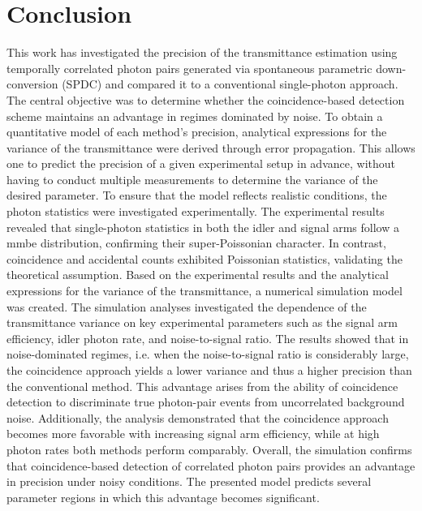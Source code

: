 \section{Conclusion}
This work has investigated the precision of the transmittance estimation using temporally correlated photon pairs generated via spontaneous parametric down-conversion (SPDC) and compared it to a conventional single-photon approach. The central objective was to determine whether the coincidence-based detection scheme maintains an advantage in regimes dominated by noise. \newline
To obtain a quantitative model of each method’s precision, analytical expressions for the variance of the transmittance were derived through error propagation. This allows one to predict the precision of a given experimental setup in advance, without having to conduct multiple measurements to determine the variance of the desired parameter. To ensure that the model reflects realistic conditions, the photon statistics were investigated experimentally. \newline
The experimental results revealed that single-photon statistics in both the idler and signal arms follow a \acrshort{mmbe} distribution, confirming their super-Poissonian character. In contrast, coincidence and accidental counts exhibited Poissonian statistics, validating the theoretical assumption. Based on the experimental results and the analytical expressions for the variance of the transmittance, a numerical simulation model was created. \newline
The simulation analyses investigated the dependence of the transmittance variance on key experimental parameters such as the signal arm efficiency, idler photon rate, and noise-to-signal ratio. The results showed that in noise-dominated regimes, i.e. when the noise-to-signal ratio is considerably large, the coincidence approach yields a lower variance and thus a higher precision than the conventional method. This advantage arises from the ability of coincidence detection to discriminate true photon-pair events from uncorrelated background noise. Additionally, the analysis demonstrated that the coincidence approach becomes more favorable with increasing signal arm efficiency, while at high photon rates both methods perform comparably. \newline
Overall, the simulation confirms that coincidence-based detection of correlated photon pairs provides an advantage in precision under noisy conditions. The presented model predicts several parameter regions in which this advantage becomes significant. \newline 
